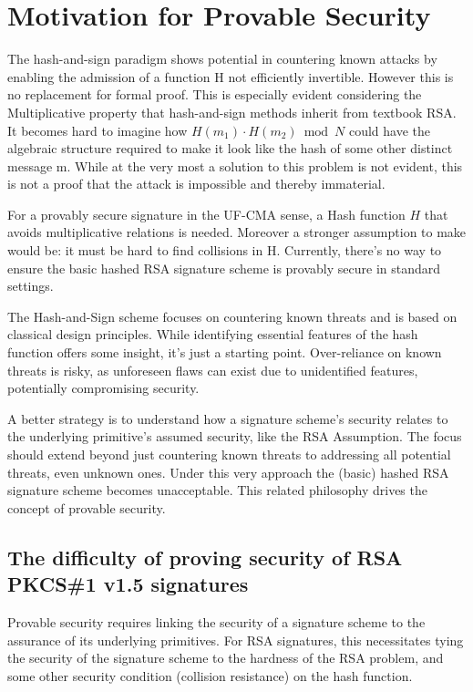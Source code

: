 \documentclass[]{final_report}
\theoremstyle{definition}
\begin{document}
\section{Motivation for Provable Security}
The hash-and-sign paradigm shows potential in countering known attacks by enabling the admission of a function H not efficiently invertible. However this is no replacement for formal proof. This is especially evident considering the Multiplicative property that hash-and-sign methods inherit from textbook RSA. It becomes hard to imagine how $H(m_{1}) \cdot H(m_{2}) \bmod N$ could have the algebraic structure required to make it look like the hash of some other distinct message m. While at the very most a solution to this problem is not evident, this is not a proof that the attack is impossible and thereby immaterial.

For a provably secure signature in the UF-CMA sense, a Hash function \(H\) that avoids multiplicative relations is needed. Moreover a stronger assumption to make would be: it must be hard to find collisions in H. Currently, there's no way to ensure the basic hashed RSA signature scheme is provably secure in standard settings.

The Hash-and-Sign scheme focuses on countering known threats and is based on classical design principles. While identifying essential features of the hash function offers some insight, it's just a starting point. Over-reliance on known threats is risky, as unforeseen flaws can exist due to unidentified features, potentially compromising security.

A better strategy is to understand how a signature scheme's security relates to the underlying primitive's assumed security, like the RSA Assumption. The focus should extend beyond just countering known threats to addressing all potential threats, even unknown ones. Under this very approach the (basic) hashed RSA signature scheme becomes unacceptable. This related philosophy drives the concept of provable security.


\subsection{The difficulty of proving security of RSA PKCS\#1 v1.5 signatures}

Provable security requires linking the security of a signature scheme to the assurance of its underlying primitives. For RSA signatures, this necessitates tying the security of the signature scheme to the hardness of the RSA problem, and some other security condition (collision resistance) on the hash function.
\end{document}
